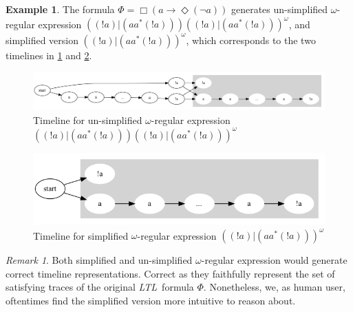 \documentclass[preprint,12pt]{elsarticle}
\theoremstyle{definition}
\newtheorem{example}{Example}[section]
\theoremstyle{remark}
\newtheorem{remark}{Remark}[section]
\newcommand{\always}{\Box}
\newcommand{\eventually}{\Diamond}
\newcommand{\limplies}{\rightarrow}
\newcommand{\ltl}{\textit{LTL}}
\begin{document}
\begin{example}
    The formula $\Phi = \always (a \limplies \eventually (\neg a))$ generates un-simplified $\omega$-regular expression $((!a) | (aa^*(!a)))((!a) | (aa^*(!a)))^{\omega}$, and simplified version $((!a) | (aa^*(!a)))^{\omega}$, which corresponds to the two timelines in \cref{fig:unsimplified} and \cref{fig:simplified}.
    \begin{figure}[h!]
        \centering
        \includegraphics[scale=0.3]{examples/ex9/ex9-unsimplified.png}
        \caption{Timeline for un-simplified $\omega$-regular expression $((!a) | (aa^*(!a)))((!a) | (aa^*(!a)))^{\omega}$}
        \label{fig:unsimplified}
    \end{figure}
    \begin{figure}[h!]
        \centering
        \includegraphics[scale=0.3]{examples/ex9/ex9.png}
        \caption{Timeline for simplified $\omega$-regular expression $((!a) | (aa^*(!a)))^{\omega}$}
        \label{fig:simplified}
    \end{figure}
\end{example}

\begin{remark}
    Both simplified and un-simplified $\omega$-regular expression would generate correct timeline representations. Correct as they faithfully represent the set of satisfying traces of the original \ltl\ formula $\Phi$. Nonetheless, we, as human user, oftentimes find the simplified version more intuitive to reason about.
\end{remark}
\end{document}
